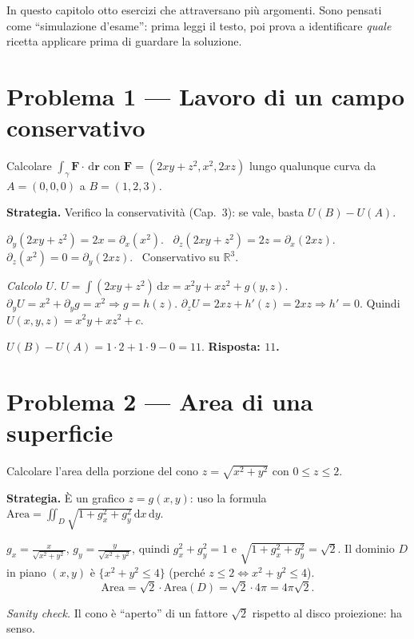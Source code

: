 \documentclass[11pt,a4paper,openany]{book}
\theoremstyle{plain}
\theoremstyle{definition}
\theoremstyle{remark}
\newcommand{\R}{\mathbb{R}}
\newcommand{\dd}{\,\mathrm{d}}
\newcommand{\F}{\mathbf{F}}
\newcommand{\rr}{\mathbf{r}}
\begin{document}
In questo capitolo otto esercizi che attraversano pi\`u argomenti.
Sono pensati come ``simulazione d'esame'': prima leggi il testo, poi prova a
identificare \emph{quale} ricetta applicare prima di guardare la soluzione.

\section*{Problema 1 --- Lavoro di un campo conservativo}

Calcolare $\int_\gamma\F\cdot\dd\rr$ con $\F=(2xy+z^2,x^2,2xz)$ lungo qualunque
curva da $A=(0,0,0)$ a $B=(1,2,3)$.

\begin{esempio}
\textbf{Strategia.} Verifico la conservativit\`a (Cap.~3): se vale, basta
$U(B)-U(A)$.

$\partial_y(2xy+z^2)=2x=\partial_x(x^2)$. \checkmark\
$\partial_z(2xy+z^2)=2z=\partial_x(2xz)$. \checkmark\
$\partial_z(x^2)=0=\partial_y(2xz)$. \checkmark\ Conservativo su $\R^3$.

\emph{Calcolo $U$.} $U=\int(2xy+z^2)\dd x=x^2 y+xz^2+g(y,z)$.
$\partial_y U=x^2+\partial_y g\stackrel{\!}{=}x^2\Rightarrow g=h(z)$.
$\partial_z U=2xz+h'(z)\stackrel{\!}{=}2xz\Rightarrow h'=0$. Quindi
$U(x,y,z)=x^2 y+xz^2+c$.

$U(B)-U(A)=1\cdot 2+1\cdot 9-0=11$. \textbf{Risposta: $11$.}
\end{esempio}

\section*{Problema 2 --- Area di una superficie}

Calcolare l'area della porzione del cono $z=\sqrt{x^2+y^2}$ con $0\le z\le 2$.

\begin{esempio}
\textbf{Strategia.} \`E un grafico $z=g(x,y)$: uso la formula
$\text{Area}=\iint_D\sqrt{1+g_x^2+g_y^2}\dd x\dd y$.

$g_x=\frac{x}{\sqrt{x^2+y^2}}$, $g_y=\frac{y}{\sqrt{x^2+y^2}}$, quindi
$g_x^2+g_y^2=1$ e $\sqrt{1+g_x^2+g_y^2}=\sqrt{2}$. Il dominio $D$ in piano
$(x,y)$ \`e $\{x^2+y^2\le 4\}$ (perch\'e $z\le 2\Leftrightarrow x^2+y^2\le 4$).
\[
  \text{Area}=\sqrt{2}\cdot\text{Area}(D)=\sqrt{2}\cdot 4\pi=4\pi\sqrt{2}.
\]

\textsl{Sanity check.} Il cono \`e ``aperto'' di un fattore $\sqrt{2}$ rispetto
al disco proiezione: ha senso.
\end{esempio}
\end{document}
